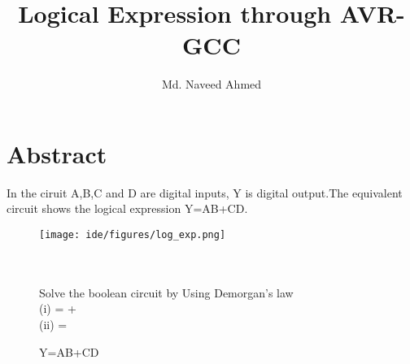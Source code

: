 \documentclass[journal,12pt,twocolumn]{IEEEtran}
\begin{document}
%

\theoremstyle{definition}
\newtheorem{theorem}{Theorem}[section]
\newtheorem{problem}{Problem}
\newtheorem{proposition}{Proposition}[section]
\newtheorem{lemma}{Lemma}[section]
\newtheorem{corollary}[theorem]{Corollary}
\newtheorem{example}{Example}[section]
\newtheorem{definition}{Definition}[section]
\newcommand{\BEQA}{\begin{eqnarray}}
\newcommand{\EEQA}{\end{eqnarray}}
\newcommand{\define}{\stackrel{\triangle}{=}}
\vspace{2cm}
\title{ 
Logical Expression through AVR-GCC
}

\author{Md. Naveed Ahmed}


\maketitle
\tableofcontents
\bigskip
%
\section{Abstract}

In the ciruit A,B,C and D are digital inputs, Y is digital output.The equivalent circuit shows the logical expression Y=AB+CD.
\begin{figure}[h]
    \centering
    \texttt{[image: ide/figures/log\_exp.png]}
    \\
    \\
    \caption{Y=AB+CD}
    \\
    Solve the boolean circuit by Using Demorgan's law \\
    (i)   = +\\
    (ii)   = \\  
    \label{fig:circuit}
\end{figure}
\end{document}

